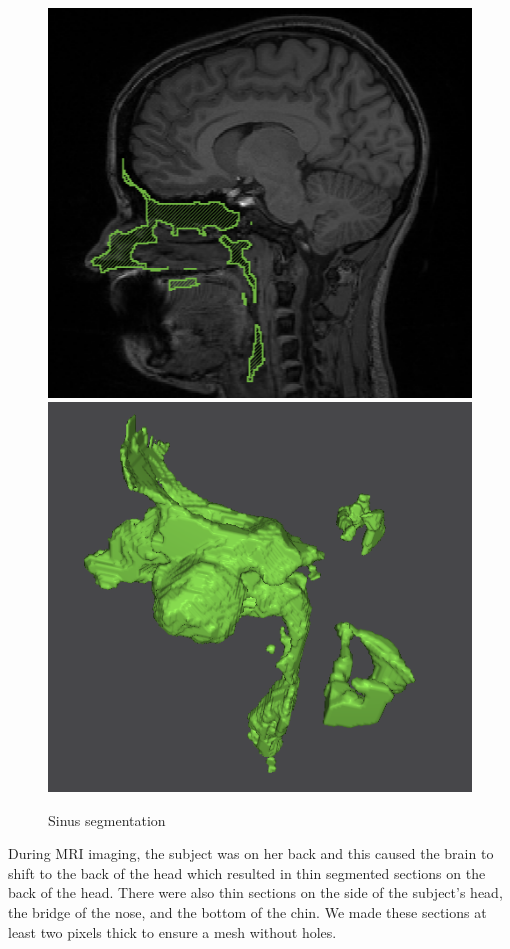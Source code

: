 \begin{figure}[H]
\begin{center}
\includegraphics[width=.49\textwidth]{Figures/sinus_sag}
\includegraphics[width=.49\textwidth]{Figures/sinus_iso}
\caption{Sinus segmentation}
\label{fig:sinus}
\end{center}
\end{figure}

During MRI imaging, the subject was on her back and this caused the brain to shift to the back of the head which resulted in thin segmented sections on the back of the head. There were also thin sections on the side of the subject's head, the bridge of the nose, and the bottom of the chin. We made these sections at least two pixels thick to ensure a mesh without holes.

